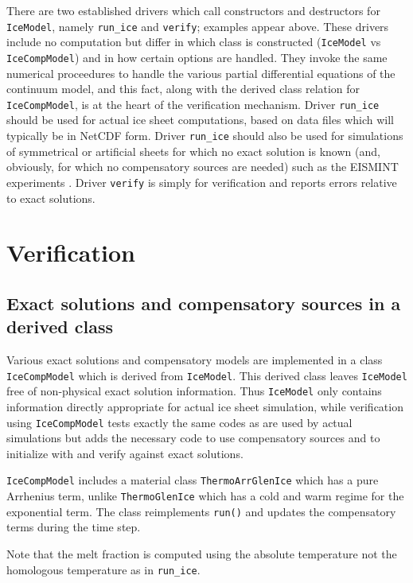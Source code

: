 \documentclass[final]{amsart}
\renewcommand{\t}[1]{\texttt{#1}}
\begin{document}
There are two established drivers which call constructors and destructors for \t{IceModel}, namely \verb|run_ice| and \verb|verify|; examples appear above.  These drivers include no computation but differ in which class is constructed (\t{IceModel} vs \t{IceCompModel}) and in how certain options are handled.  They invoke the same numerical proceedures to handle the various partial differential equations of the continuum model, and this fact, along with the derived class relation for \t{IceCompModel}, is at the heart of the verification mechanism.  Driver \verb|run_ice| should be used for actual ice sheet computations, based on data files which will typically be in NetCDF form.  Driver \verb|run_ice| should also be used for simulations of symmetrical or artificial sheets for which no exact solution is known (and, obviously, for which no compensatory sources are needed) such as the EISMINT experiments \cite{EISMINT96,EISMINT00}.  Driver \verb|verify| is simply for verification and reports errors relative to exact solutions.



\section{Verification}

\subsection{Exact solutions and compensatory sources in a derived class}  Various exact solutions and compensatory models are implemented in a class \t{IceCompModel} which is derived from \t{IceModel}.  This derived class leaves \t{IceModel} free of non-physical exact solution information.  Thus \t{IceModel} only contains information directly appropriate for actual ice sheet simulation, while verification using \t{IceCompModel} tests exactly the same codes as are used by actual simulations but adds the necessary code to use compensatory sources and to initialize with and verify against exact solutions.

\t{IceCompModel} includes a material class \t{ThermoArrGlenIce} which has a pure Arrhenius term, unlike \t{ThermoGlenIce} which has a cold and warm regime for the exponential term.  The class reimplements \t{run()} and updates the compensatory terms during the time step.

Note that the melt fraction is computed using the absolute temperature not the homologous temperature as in \verb|run_ice|.
\end{document}
